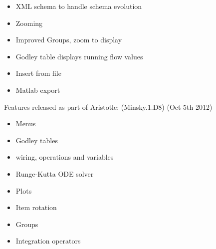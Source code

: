 \begin{itemize}
\item XML schema to handle schema evolution
\item Zooming
\item Improved Groups, zoom to display
\item Godley table displays running flow values
\item Insert from file
\item Matlab export
\end{itemize}

Features released as part of Aristotle: (Minsky.1.D8) (Oct 5th 2012)

\begin{itemize}
\item Menus
\item Godley tables
\item wiring, operations and variables
\item Runge-Kutta ODE solver
\item Plots
\item Item rotation
\item Groups
\item Integration operators
\end{itemize}
